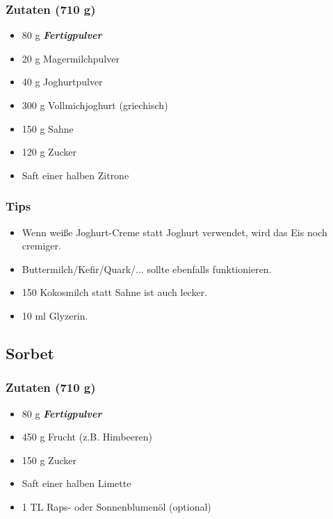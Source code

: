 \documentclass[12pt]{article}
\begin{document}
\subsubsection{Zutaten (710 g)}
\begin{itemize}
	\item 80 g \textbf{\textit{Fertigpulver}}
  	\item 20 g Magermilchpulver
  	\item 40 g Joghurtpulver
\end{itemize}
\begin{itemize}
  \item 300 g Vollmichjoghurt (griechisch)
  \item 150 g Sahne
  \item 120 g Zucker
  \item Saft einer halben Zitrone %
\end{itemize}
\subsubsection{Tips}

\begin{itemize}
	  \item Wenn weiße Joghurt-Creme statt Joghurt verwendet, wird das Eis noch cremiger.
	  \item Buttermilch/Kefir/Quark/... sollte ebenfalls funktionieren.
	  \item 150 Kokosmilch statt Sahne ist auch lecker.
	  \item 10 ml Glyzerin.
\end{itemize}



\subsection{Sorbet}
\subsubsection {Zutaten (710 g)}
\begin{itemize}
  	\item 80 g \textbf{\textit{Fertigpulver}}
\end{itemize}
\begin{itemize}
  	\item 450 g Frucht (z.B. Himbeeren)
  	\item 150 g Zucker
  	\item Saft einer halben Limette %
  	\item 1 TL Raps- oder Sonnenblumenöl (optional) 
\end{itemize}
\end{document}
